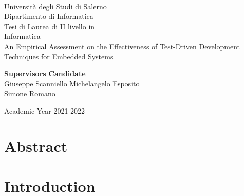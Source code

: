 \documentclass[11pt, oneside]{book}
\begin{document}
    \begin{titlepage}
        \begin{center}
            \\[0.2truecm]
            {\Large Universit\`a degli Studi di Salerno}\\[0.2truecm]
            {\large Dipartimento di Informatica}\\
            \hrulefill
            \vfill
            {\large Tesi di Laurea di II livello in }\\[0.2truecm]
            {\Large Informatica}\\
            \vfill\vfill
            {\Huge An Empirical Assessment on the Effectiveness of Test-Driven Development Techniques for Embedded Systems}
            \vfill\vfill
            
            
            {\bf Supervisors} \hfill {\bf Candidate}\ \ \\
            Giuseppe Scanniello \hfill Michelangelo Esposito\\
            Simone Romano \hfill \ \ \\
            
            \vfill
            \hrulefill 
            
            Academic Year 2021-2022
        \end{center}
    \end{titlepage}


    \chapter*{Abstract}
    
    
    \tableofcontents
    \pagestyle{plain}

    
    

    \chapter{Introduction}
    \setcounter{page}{1} 
    
    
    
    
    
    
    

    \nocite{*}
    \printbibliography[title={Bibliography}] 

    \appendix
    
    
    
    
    
\end{document}
